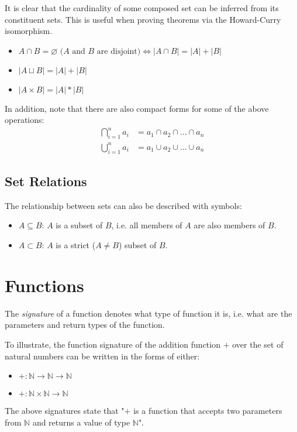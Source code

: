 \documentclass[12pt]{article}
\theoremstyle{definition}
\newcommand{\NN}{\mathbb{N}}
\begin{document}
	It is clear that the cardinality of some composed set can be inferred from its constituent sets. This is useful when proving theorems via the Howard-Curry isomorphism.
	\begin{itemize}
		\item $A \cap B = \varnothing \text{ ($A$ and $B$ are disjoint)} \iff |A \cap B| = |A| + |B|$
		\item $|A \sqcup B| = |A| + |B|$
		\item $|A \times B| = |A| * |B|$
	\end{itemize}
	
	In addition, note that there are also compact forms for some of the above operations:
	\begin{align*}
		\bigcap^n_{i=1} a_i &= a_1 \cap a_2 \cap \dots \cap a_n\\
		\bigcup^n_{i=1} a_i &= a_1 \cup a_2 \cup \dots \cup a_n
	\end{align*}
	
	\subsection{Set Relations}
	
	The relationship between sets can also be described with symbols:
	\begin{itemize}
		\item $A \subseteq B$: $A$ is a subset of $B$, i.e. all members of $A$ are also members of $B$.
		\item $A \subset B$: $A$ is a strict ($A \neq B$) subset of $B$.
 	\end{itemize}
 	
 	\section{Functions}
 	
 	The \emph{signature} of a function denotes what type of function it is, i.e. what are the parameters and return types of the function.
 	
 	To illustrate, the function signature of the addition function $+$ over the set of natural numbers can be written in the forms of either:
 	\begin{itemize}
 		\item $+ : \NN \to \NN \to \NN$
 		\item $+ : \NN \times \NN \to \NN$
 	\end{itemize}
 	
 	The above signatures state that "$+$ is a function that accepts two parameters from $\NN$ and returns a value of type $\NN$".
 	
\end{document}
